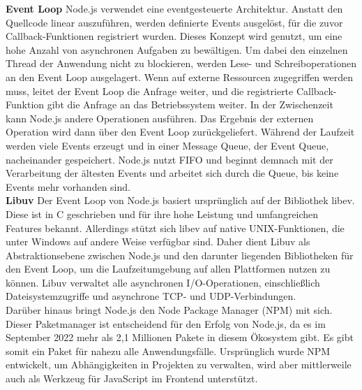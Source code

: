 \noindent
\textbf{Event Loop} \newline
Node.js verwendet eine eventgesteuerte Architektur. Anstatt den Quellcode linear auszuführen, werden definierte Events ausgelöst, für die zuvor Callback-Funktionen registriert wurden. Dieses Konzept wird genutzt, um eine hohe Anzahl von asynchronen Aufgaben zu bewältigen. Um dabei den einzelnen Thread der Anwendung nicht zu blockieren, werden Lese- und Schreiboperationen an den Event Loop ausgelagert.  Wenn auf externe Ressourcen zugegriffen werden muss, leitet der Event Loop die Anfrage weiter, und die registrierte Callback-Funktion gibt die Anfrage an das Betriebssystem weiter. In der Zwischenzeit kann Node.js andere Operationen ausführen. Das Ergebnis der externen Operation wird dann über den Event Loop zurückgeliefert. \cite{Springer.2022} \newline 
Während der Laufzeit werden viele Events erzeugt und in einer Message Queue, der Event Queue, nacheinander gespeichert. Node.js nutzt FIFO und beginnt demnach mit der Verarbeitung der ältesten Events und arbeitet sich durch die Queue, bis keine Events mehr vorhanden sind. \cite{OpenJSFoundation.o.J.} \\

\noindent
\textbf{Libuv} \newline
Der Event Loop von Node.js basiert ursprünglich auf der Bibliothek libev. Diese ist in C geschrieben und für ihre hohe Leistung und umfangreichen Features bekannt. Allerdings stützt sich libev auf native UNIX-Funktionen, die unter Windows auf andere Weise verfügbar sind. Daher dient Libuv als Abstraktionsebene zwischen Node.js und den darunter liegenden Bibliotheken für den Event Loop, um die Laufzeitumgebung auf allen Plattformen nutzen zu können. Libuv verwaltet alle asynchronen I/O-Operationen, einschließlich Dateisystemzugriffe und asynchrone TCP- und UDP-Verbindungen. \cite{Springer.2022} \\

\noindent
Darüber hinaus bringt Node.js den Node Package Manager (NPM) mit sich. Dieser Paketmanager ist entscheidend für den Erfolg von Node.js, da es im September 2022 mehr als 2,1 Millionen Pakete in diesem Ökosystem gibt. Es gibt somit ein Paket für nahezu alle Anwendungsfälle. Ursprünglich wurde NPM entwickelt, um Abhängigkeiten in Projekten zu verwalten, wird aber mittlerweile auch als Werkzeug für JavaScript im Frontend unterstützt. \cite{OpenJSFoundation.2022}\\


